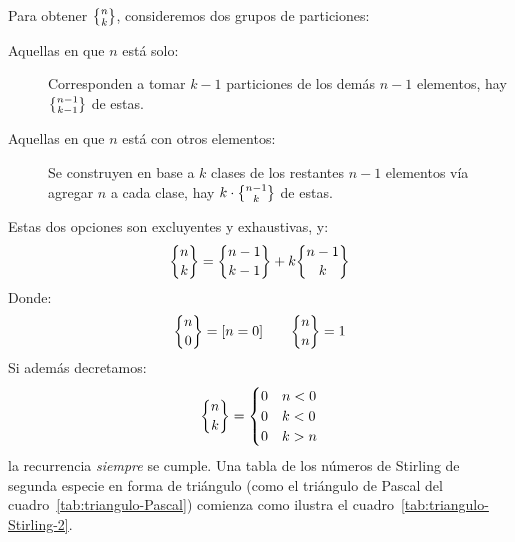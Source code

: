   Para obtener \(\classes{n}{k}\),
  consideremos dos grupos de particiones:%
  \begin{description}
  \item[\boldmath Aquellas en que \(n\) está solo:\unboldmath]
    Corresponden a tomar \(k - 1\) particiones
    de los demás \(n - 1\) elementos,
    hay \(\classes{n - 1}{k - 1}\) de estas.
  \item[\boldmath Aquellas en que \(n\) está con otros elementos:\unboldmath]
    Se construyen en base a \(k\) clases
    de los restantes \(n - 1\) elementos
    vía agregar \(n\) a cada clase,
    hay \(k \cdot \classes{n - 1}{k}\) de estas.
  \end{description}
  Estas dos opciones son excluyentes y exhaustivas,
  y:
  \begin{equation}
    \label{eq:recurrence-Stirling-2}
    \classes{n}{k} = \classes{n - 1}{k - 1} + k \classes{n - 1}{k}
  \end{equation}
  Donde:
  \begin{equation*}
    \classes{n}{0}
      = [n = 0]
    \qquad
    \classes{n}{n}
      = 1
  \end{equation*}
  Si además decretamos:
  \begin{equation*}
    \classes{n}{k} =
      \begin{cases}
	0 & n < 0 \\
	0 & k < 0 \\
	0 & k > n
      \end{cases}
  \end{equation*}
  la recurrencia \emph{siempre} se cumple.
  Una tabla de los números de Stirling de segunda especie
  en forma de triángulo
  (como el triángulo de Pascal del cuadro~\ref{tab:triangulo-Pascal})
  comienza como ilustra el cuadro~\ref{tab:triangulo-Stirling-2}.
